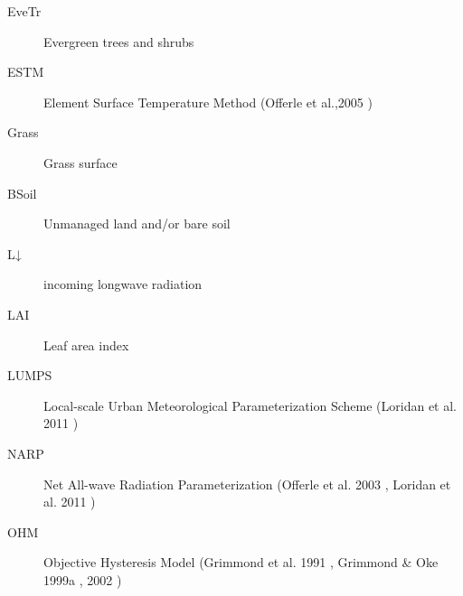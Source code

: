 \documentclass[letterpaper,10pt,english]{sphinxmanual}
\begin{document}
\begin{description}
\item[{EveTr}] \leavevmode{}\label{\detokenize{notation:term-evetr}}
Evergreen trees and shrubs

\item[{ESTM}] \leavevmode{}\label{\detokenize{notation:term-estm}}
Element Surface Temperature Method (Offerle et al.,2005 \label{\detokenize{notation:id1}}{\hyperref[\detokenize{references:oaf2005}]{\sphinxcrossref{{[}Oaf2005{]}}}})

\item[{Grass}] \leavevmode{}\label{\detokenize{notation:term-grass}}
Grass surface

\item[{BSoil}] \leavevmode{}\label{\detokenize{notation:term-bsoil}}
Unmanaged land and/or bare soil

\item[{L↓}] \leavevmode{}\label{\detokenize{notation:term-l}}
incoming longwave radiation

\item[{LAI}] \leavevmode{}\label{\detokenize{notation:term-lai}}
Leaf area index

\item[{LUMPS}] \leavevmode{}\label{\detokenize{notation:term-lumps}}
Local-scale Urban Meteorological Parameterization Scheme
(Loridan   et al. 2011 \label{\detokenize{notation:id2}}{\hyperref[\detokenize{references:l2011}]{\sphinxcrossref{{[}L2011{]}}}})

\item[{NARP}] \leavevmode{}\label{\detokenize{notation:term-narp}}
Net All-wave  Radiation   Parameterization (Offerle et al. 2003 \label{\detokenize{notation:id3}}{\hyperref[\detokenize{references:o2003}]{\sphinxcrossref{{[}O2003{]}}}}, Loridan et al. 2011 \label{\detokenize{notation:id4}}{\hyperref[\detokenize{references:l2011}]{\sphinxcrossref{{[}L2011{]}}}})

\item[{OHM}] \leavevmode{}\label{\detokenize{notation:term-ohm}}
Objective Hysteresis Model (Grimmond et al. 1991 \label{\detokenize{notation:id5}}{\hyperref[\detokenize{references:g91ohm}]{\sphinxcrossref{{[}G91OHM{]}}}}, Grimmond \& Oke 1999a \label{\detokenize{notation:id6}}{\hyperref[\detokenize{references:go99qs}]{\sphinxcrossref{{[}GO99QS{]}}}}, 2002 \label{\detokenize{notation:id7}}{\hyperref[\detokenize{references:go2002}]{\sphinxcrossref{{[}GO2002{]}}}})


\end{description}
\end{document}

